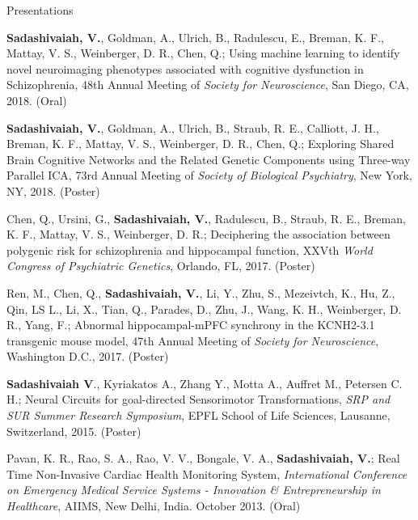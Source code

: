 \documentclass{resume}
\begin{document}
\begin{rSection}{Presentations}
\begin{presentations}
\item \textbf{Sadashivaiah, V.}, Goldman, A., Ulrich, B., Radulescu, E., Breman, K. F., Mattay, V. S., Weinberger, D. R., Chen, Q.; Using machine learning to identify novel neuroimaging phenotypes associated with cognitive dysfunction in Schizophrenia, 48th Annual Meeting of \textit{Society for Neuroscience}, San Diego, CA, 2018. (Oral)

\item \textbf{Sadashivaiah, V.}, Goldman, A., Ulrich, B., Straub, R. E., Calliott, J. H., Breman, K. F., Mattay, V. S., Weinberger, D. R., Chen, Q.; Exploring Shared Brain Cognitive Networks and the Related Genetic Components using Three-way Parallel ICA, 73rd Annual Meeting of \textit{Society of Biological Psychiatry}, New York, NY, 2018. (Poster) 

\item Chen, Q., Ursini, G., \textbf{Sadashivaiah, V.}, Radulescu, B., Straub, R. E., Breman, K. F., Mattay, V. S., Weinberger, D. R.; Deciphering the association between polygenic risk for schizophrenia and hippocampal function, XXVth \textit{World Congress of Psychiatric Genetics}, Orlando, FL, 2017. (Poster)

\item Ren, M., Chen, Q., \textbf{Sadashivaiah, V.}, Li, Y., Zhu, S., Mezeivtch, K., Hu, Z.,  Qin, LS L., Li, X., Tian, Q., Parades, D., Zhu, J., Wang, K. H., Weinberger, D. R., Yang, F.; Abnormal hippocampal-mPFC synchrony in the KCNH2-3.1 transgenic mouse model, 47th Annual Meeting of \textit{Society for Neuroscience}, Washington D.C., 2017. (Poster)

\item \textbf{Sadashivaiah V}.,  Kyriakatos A.,  Zhang Y.,  Motta A.,  Auffret M.,  Petersen C. H.; Neural Circuits for goal-directed Sensorimotor Transformations, \textit{SRP and SUR Summer Research Symposium}, EPFL School of Life Sciences, Lausanne, Switzerland, 2015. (Poster)

\item Pavan, K. R., Rao, S. A., Rao, V. V., Bongale, V. A., \textbf{Sadashivaiah, V.}; Real Time Non-Invasive Cardiac Health Monitoring System,  \textit{International Conference on Emergency Medical Service Systems - Innovation \& Entrepreneurship in Healthcare}, AIIMS, New Delhi, India. October 2013. (Oral)
\end{presentations}
\end{rSection} 
\end{document}
